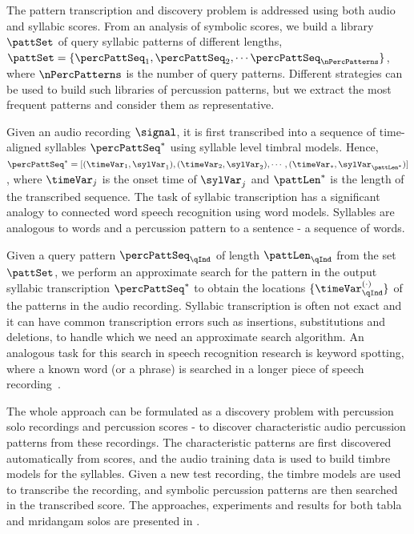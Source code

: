 The pattern transcription and discovery problem is addressed using both audio and syllabic scores. From an analysis of symbolic scores, we build a library $\pattSet$ of query syllabic patterns of different lengths, $\pattSet = \{\percPattSeq_1, \percPattSeq_2, \cdots \percPattSeq_\nPercPatterns\}$, where $\nPercPatterns$ is the number of query patterns. Different strategies can be used to build such libraries of percussion patterns, but we extract the most frequent patterns and consider them as representative. 

Given an audio recording $\signal$, it is first transcribed into a sequence of time-aligned syllables $\percPattSeq^{\optstar}$ using syllable level timbral models. Hence, $\percPattSeq^{\optstar} = [(\timeVar_1,\sylVar_1), (\timeVar_2,\sylVar_2), \cdots, (\timeVar_{\optstar},\sylVar_{\pattLen^{\optstar}})]$, where $\timeVar_j$ is the onset time of $\sylVar_j$ and $\pattLen^{\optstar}$ is the length of the transcribed sequence. The task of syllabic transcription has a significant analogy to connected word speech recognition using word models. Syllables are analogous to words and a percussion pattern to a sentence - a sequence of words. 

Given a query pattern $\percPattSeq_\qInd$ of length $\pattLen_\qInd$ from the set $\pattSet$, we perform an approximate search for the pattern in the output syllabic transcription $\percPattSeq^{\optstar}$ to obtain the locations $\{\timeVar_\qInd^{(\cdot)}\}$ of the patterns in the audio recording. Syllabic transcription is often not exact and it can have common transcription errors such as insertions, substitutions and deletions, to handle which we need an approximate search algorithm. An analogous task for this search in speech recognition research is keyword spotting, where a known word (or a phrase) is searched in a longer piece of speech recording~\cite{wilpon:90:keyspot}.

The whole approach can be formulated as a discovery problem with percussion solo recordings and percussion scores - to discover characteristic audio percussion patterns from these recordings. The characteristic patterns are first discovered automatically from scores, and the audio training data is used to build timbre models for the syllables. Given a new test recording, the timbre models are used to transcribe the recording, and symbolic percussion patterns are then searched in the transcribed score. The approaches, experiments and results for both \gls{tabla} and mridangam solos are presented in . 
%
